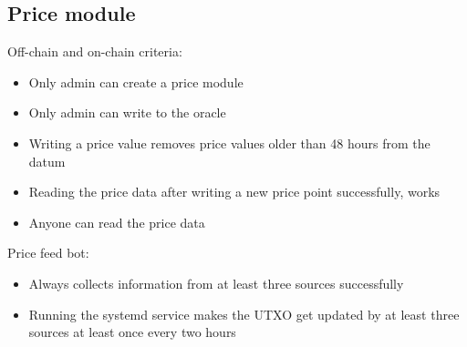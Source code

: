\documentclass{article} %
\begin{document}
\subsection{Price module}

Off-chain and on-chain criteria:
\begin{itemize}
  \item Only admin can create a price module
  \item Only admin can write to the oracle
  \item Writing a price value removes price values older than 48 hours from the
    datum
  \item Reading the price data after writing a new price point successfully,
    works
  \item Anyone can read the price data
\end{itemize}

Price feed bot:
\begin{itemize}
  \item Always collects information from at least three sources successfully
  \item Running the systemd service makes the UTXO get updated by at least three
    sources at least once every two hours
\end{itemize}

% 
% 
% 
% 
\end{document}
